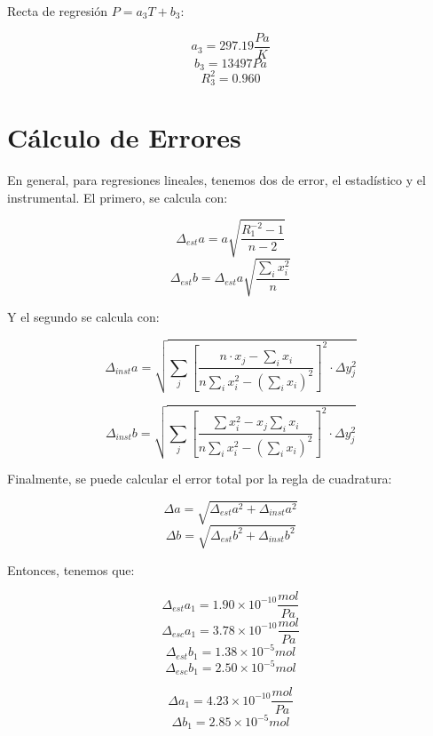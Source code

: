 \documentclass[a4paper,12pt]{article}
\begin{document}
Recta de regresión $P = a_3 T + b_3 $:

\begin{equation}
  a_3 = 297.19 \frac{Pa}{K}
\end{equation}
\begin{equation}
   b_3 = 13497 Pa
\end{equation}
\begin{equation}
  R_3^2 = 0.960
\end{equation}

\section{Cálculo de Errores}
En general, para regresiones lineales, tenemos dos de error, el estadístico y el instrumental. El primero, se calcula con:

$$\Delta_{est} a= a\sqrt{\frac{R_1^{-2}-1}{n-2}}$$ 
$$\Delta_{est} b = \Delta_{est} a\sqrt{\frac{\sum_i x_i^2}{n}}$$

Y el segundo se calcula con:

  $$\Delta_{inst} a = \sqrt{\sum_j\left[ \frac{n\cdot x_j - \sum_ix_i}{n\sum_i x_i^2-\left(  \sum_i  x_i\right)^2} \right]^2 \cdot \Delta y_j^2}$$ 

  $$\Delta_{inst} b =\sqrt{\sum_j\left[ \frac{\sum x_i^2 -x_j \sum_i x_i}{n\sum_i x_i^2-\left(  \sum_i  x_i\right)^2} \right]^2 \cdot \Delta y_j^2}$$

Finalmente, se puede calcular el error total por la regla de cuadratura:

\begin{equation}
  \Delta a = \sqrt{\Delta_{est} a^2 + \Delta_{inst} a^2}
\end{equation}
\begin{equation}
  \Delta b = \sqrt{\Delta_{est} b^2 + \Delta_{inst} b^2}
\end{equation}

Entonces, tenemos que:


  $$\Delta_{est} a_1 = 1.90 \times 10^{-10} \frac{mol}{Pa}$$
  $$\Delta_{esc} a_1 = 3.78 \times 10^{-10} \frac{mol}{Pa}$$
  $$\Delta_{est} b_1 = 1.38 \times 10^{-5} mol $$
  $$\Delta_{esc} b_1 = 2.50 \times 10^{-5} mol$$

  \begin{equation}
    \Delta a_1 = 4.23 \times 10^{-10}\frac{mol}{Pa}
  \end{equation}
  \begin{equation}
    \Delta b_1 = 2.85\times 10^{-5} mol
  \end{equation}
\end{document}
